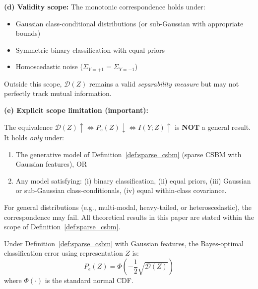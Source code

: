 \begin{remark}
\textbf{(d) Validity scope:}
The monotonic correspondence holds under:
\begin{itemize}
    \item Gaussian class-conditional distributions (or sub-Gaussian with appropriate bounds)
    \item Symmetric binary classification with equal priors
    \item Homoscedastic noise ($\Sigma_{Y=+1} = \Sigma_{Y=-1}$)
\end{itemize}
Outside this scope, $\mathcal{D}(Z)$ remains a valid \textit{separability measure} but may not perfectly track mutual information.

\textbf{(e) Explicit scope limitation (important):}
\begin{tcolorbox}[colback=yellow!5!white,colframe=orange!75!black,title=Scope of Monotonic Correspondence]
The equivalence $\mathcal{D}(Z) \uparrow \Leftrightarrow P_e(Z) \downarrow \Leftrightarrow I(Y;Z) \uparrow$ is \textbf{NOT} a general result. It holds \textit{only} under:
\begin{enumerate}
    \item The generative model of Definition~\ref{def:sparse_csbm} (sparse CSBM with Gaussian features), OR
    \item Any model satisfying: (i) binary classification, (ii) equal priors, (iii) Gaussian or sub-Gaussian class-conditionals, (iv) equal within-class covariance.
\end{enumerate}
For general distributions (e.g., multi-modal, heavy-tailed, or heteroscedastic), the correspondence may fail. All theoretical results in this paper are stated within the scope of Definition~\ref{def:sparse_csbm}.
\end{tcolorbox}
\end{remark}

\begin{proposition}
\label{prop:bayes_error}
Under Definition~\ref{def:sparse_csbm} with Gaussian features, the Bayes-optimal classification error using representation $Z$ is:
\begin{equation}
    P_e(Z) = \Phi\left(-\frac{1}{2}\sqrt{\mathcal{D}(Z)}\right)
\end{equation}
where $\Phi(\cdot)$ is the standard normal CDF.
\end{proposition}

